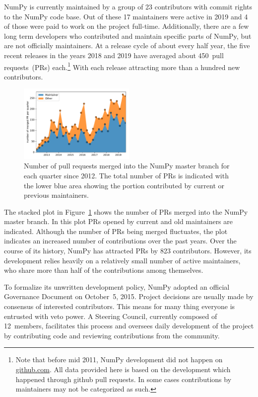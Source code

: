 NumPy is currently maintained by a group of 23 contributors with commit rights
to the NumPy code base. Out of these 17 maintainers were active in 2019 and 4
of those were paid to work on the project full-time.
Additionally, there are a few long term developers who contributed and maintain
specific parts of NumPy, but are not officially maintainers.
At a release cycle of about every half year, the five recent releases in the years
2018 and 2019 have averaged about 450~pull requests~(PRs) each.\footnote{
    Note that before mid 2011, NumPy development did not happen on \url{github.com}.
    All data provided here is based on the development which happened through github
    pull requests. In some cases contributions by maintainers may not be categorized as such.}
With each release attracting more than a hundred new contributors.

\begin{figure}
    \centering
    \includegraphics[width=0.5\textwidth]{scripts/PRs-using-CURRENT_MAINTAINERS.pdf}
    \caption{Number of pull requests merged into the NumPy master branch for each
        quarter since 2012. The total number of PRs is indicated with the
        lower blue area showing the portion contributed by current or previous
        maintainers.}\label{fig:prs-over-time}
\end{figure}

The stacked plot in Figure~\ref{fig:prs-over-time} shows the number of
PRs merged into the NumPy master branch.
In this plot PRs opened by current and old maintainers are indicated.
Although the number of PRs being merged fluctuates,
the plot indicates an increased number of contributions over the past
years.
Over the course of its history, NumPy has attracted PRs by 823 contributors.
However, its development relies heavily on a relatively small number
of active maintainers, who share more than half of the contributions among
themselves.

To formalize its unwritten development policy,
NumPy adopted an official Governance Document on October~5,
2015\cite{NumPyProjectGovernance}.
Project decisions are usually made by consensus of interested contributors.
This means for many thing everyone is entrusted with veto power.
A Steering Council, currently composed of 12~members, facilitates this
process and oversees daily development of the project by contributing code
and reviewing contributions from the community.

